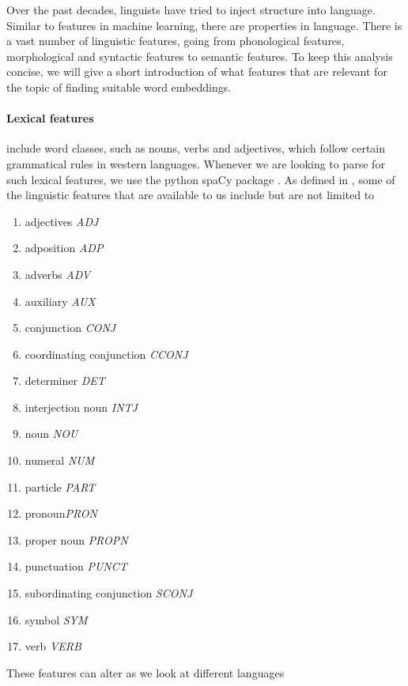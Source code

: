 \documentclass[a4paper,12pt,twoside,openright]{report}
\begin{document}
Over the past decades, linguists have tried to inject structure into language. 
Similar to features in machine learning, there are properties in language. 
There is a vast number of linguistic features, going from phonological features, morphological and syntactic features to semantic features.
To keep this analysis concise, we will give a short introduction of what features that are relevant for the topic of finding suitable word embeddings.

\paragraph{Lexical features} include word classes, such as nouns, verbs and adjectives, which follow certain grammatical rules in western languages.
Whenever we are looking to parse for such lexical features, we use the python spaCy package \cite{spacy}.
As defined in \cite{spacyb}, some of the linguistic features that are available to us include but are not limited to

\begin{enumerate}
\item adjectives \textit{ADJ}
\item adposition \textit{ADP}
\item adverbs \textit{ADV}
\item auxiliary \textit{AUX}
\item conjunction \textit{CONJ}
\item coordinating conjunction \textit{CCONJ}
\item determiner \textit{DET}
\item interjection noun \textit{INTJ}
\item noun \textit{NOU}
\item numeral \textit{NUM}
\item particle \textit{PART}
\item pronoun\textit{PRON}
\item proper noun \textit{PROPN}
\item punctuation \textit{PUNCT}
\item subordinating conjunction \textit{SCONJ}
\item symbol \textit{SYM}
\item verb \textit{VERB}
\end{enumerate}

These features can alter as we look at different languages

\paragraph{}
\end{document}
